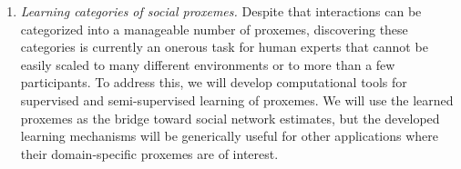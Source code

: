 \begin{enumerate}





\vspace{-0.1in}\item \emph{Learning categories of social proxemes.} Despite that interactions can be categorized into a manageable number of proxemes, discovering these categories is currently an onerous task for human experts that cannot be easily scaled to many different environments or to more than a few participants. To address this, we will develop computational tools for supervised and semi-supervised learning of proxemes. We will use the learned proxemes as the bridge toward social network estimates, but the developed learning mechanisms will be generically useful for other applications where their domain-specific proxemes are of interest. 



\end{enumerate}
